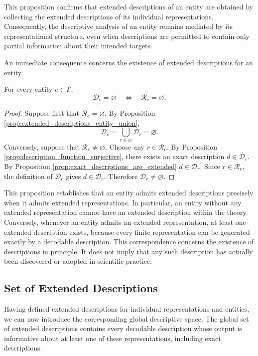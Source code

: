 This proposition confirms that extended descriptions of an entity are obtained by collecting the extended descriptions of its individual representations. Consequently, the descriptive analysis of an entity remains mediated by its representational structure, even when descriptions are permitted to contain only partial information about their intended targets.

An immediate consequence concerns the existence of extended descriptions for an entity.

\begin{proposition}
\label{prop:extended_descriptions_entity_empty_iff_repr_empty}
For every entity $e\in\mathcal{E}$,
\[
\mathcal{D}_e=\varnothing \quad\Longleftrightarrow\quad \mathcal{R}_e=\varnothing.
\]
\end{proposition}
\begin{proof}
Suppose first that $\mathcal{R}_e=\varnothing$. By Proposition \ref{prop:extended_descriptions_entity_union},
\[
\mathcal{D}_e = \bigcup_{r\in\varnothing}\mathcal{D}_r = \varnothing.
\]
Conversely, suppose that $\mathcal{R}_e\neq\varnothing$. Choose any $r\in\mathcal{R}_e$. By Proposition \ref{prop:description_function_surjective}, there exists an exact description $d\in\bar{\mathcal{D}}_r$. By Proposition \ref{prop:exact_descriptions_are_extended} $d\in\mathcal{D}_r$. Since $r\in\mathcal{R}_e$, the definition of $\mathcal{D}_e$ gives $d\in\mathcal{D}_e$. Therefore $\mathcal{D}_e\neq\varnothing$.
\end{proof}

This proposition establishes that an entity admits extended descriptions precisely when it admits extended representations. In particular, an entity without any extended representation cannot have an extended description within the theory. Conversely, whenever an entity admits an extended representation, at least one extended description exists, because every finite representation can be generated exactly by a decodable description. This correspondence concerns the existence of descriptions in principle. It does not imply that any such description has actually been discovered or adopted in scientific practice.


\subsection*{Set of Extended Descriptions}

Having defined extended descriptions for individual representations and entities, we can now introduce the corresponding global descriptive space. The global set of extended descriptions contains every decodable description whose output is informative about at least one of these representations, including exact descriptions.

